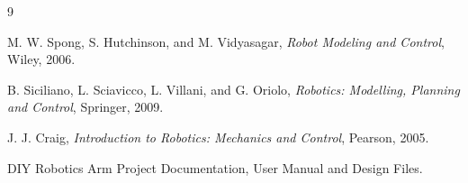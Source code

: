 \renewcommand{\bibname}{المراجع} %

\begin{thebibliography}{9}

\textenglish{M. W. Spong, S. Hutchinson, and M. Vidyasagar, \textit{Robot Modeling and Control}, Wiley, 2006.}

\textenglish{B. Siciliano, L. Sciavicco, L. Villani, and G. Oriolo, \textit{Robotics: Modelling, Planning and Control}, Springer, 2009.}

\textenglish{J. J. Craig, \textit{Introduction to Robotics: Mechanics and Control}, Pearson, 2005.}

\textenglish{DIY Robotics Arm Project Documentation, User Manual and Design Files.}

\end{thebibliography}